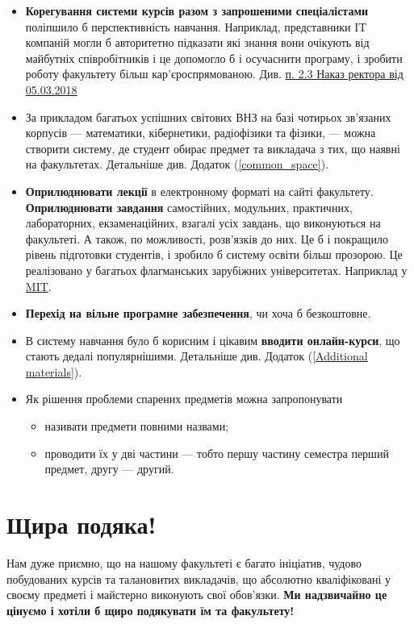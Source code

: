 \documentclass[14pt, a4paper]{extarticle}  %
\begin{document}
\begin{itemize}
    \item  \textbf{Корегування системи курсів разом з  запрошеними спеціалістами} поліпшило б перспективність навчання. Наприклад, представники IT компаній могли б авторитетно підказати які знання вони очікують від майбутніх співробітників і це допомогло б і осучаснити програму, і зробити роботу факультету більш кар'єроспрямо\-ваною. Див. \href{http://nmc.univ.kiev.ua/docs/Poryadok_OP.pdf}{п. 2.3 Наказ ректора від 05.03.2018}
    
    \item За прикладом багатьох успішних світових ВНЗ на базі чотирьох зв'язаних корпусів --- математики, кібернетики, радіофізики та фізики, --- можна створити систему, де студент обирає предмет та викладача з тих, що наявні на факультетах. Детальніше див. Додаток (\ref{common_space}).
    
    \item  \textbf{Оприлюднювати лекції} в електронному форматі на сайті факультету.
     \textbf{Оприлюднювати завдання} самостійних, модульних, практичних, лабораторних, екзаменаційних, взагалі усіх завдань, що виконуються на факультеті. А також, по можливості, розв'язків до них. Це б і покращило рівень підготовки студентів, і зробило б систему освіти більш прозорою. Це реалізовано у багатьох флагманських зарубіжних університетах. Наприклад у \href{https://ocw.mit.edu/index.htm}{MIT}.
    
    \item \textbf{Перехід на вільне програмне забезпечення}, чи хоча б безкоштовне.
    
    \item В систему навчання було б корисним і цікавим \textbf{вводити онлайн-курси}, що стають дедалі популярнішими. Детальніше див. Додаток (\ref{Additional materials}).
    
    \item Як рішення проблеми спарених предметів можна запропонувати
    \begin{itemize}
        \item називати предмети повними назвами;
        \item проводити їх у дві частини --- тобто першу частину семестра перший предмет, другу --- другий.
    \end{itemize}
\end{itemize}

\newpage
\section{Щира подяка!}
Нам дуже приємно, що на нашому факультеті є багато ініціатив, чудово побудованих курсів та талановитих викладачів, що абсолютно кваліфіковані у своєму предметі і майстерно виконують свої обов'язки. \textbf{Ми надзвичайно це цінуємо і хотіли б щиро подякувати їм та факультету! }\medskip
\end{document}
